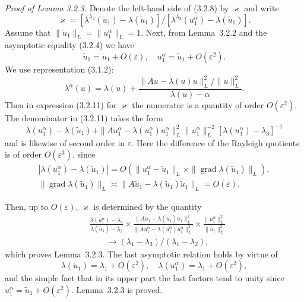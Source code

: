 \documentclass[11pt,oneside]{book}
\begin{document}
\textit{Proof of Lemma 3.2.3.} Denote the left-hand side of (3.2.8) by $\varkappa$ and write
\[
\varkappa = [\lambda^{\lambda_2}(\tilde{u}_1) - \lambda(\tilde{u}_1)] / [\lambda^{\lambda_3}(u_1^\alpha) - \lambda(\tilde{u}_1)].
\tag{3.2.11}
\]
Assume that $\|\tilde{u}_1\|_L = \|u_1^\alpha\|_L = 1$. Next, from Lemma~3.2.2 and %
the asymptotic equality (3.2.4) we have
\[
\tilde{u}_1 = u_1 + O(\varepsilon), \quad u_1^\alpha = \tilde{u}_1 + O(\varepsilon^2).
\]
We use representation (3.1.2):
\[
\lambda^\alpha(u) = \lambda(u) + \frac{\|Au - \lambda(u)u\|_L^2 / \|u\|_L^2}{\lambda(u) - \alpha}.
\]
Then in expression (3.2.11) for $\varkappa$ the numerator is a quantity of order $O(\varepsilon^2)$. The denominator in (3.2.11) takes the form
\[
\lambda(u_1^\alpha) - \lambda(\tilde{u}_1) + \|Au_1^\alpha - \lambda(u_1^\alpha)u_1^\alpha\|_L^2 \|u_1^\alpha\|_L^{-2} [\lambda(u_1^\alpha) - \lambda_3]^{-1}
\]
and is likewise of second order in $\varepsilon$. Here the difference of the Rayleigh quotients is of order $O(\varepsilon^3)$, since
\begin{gather*}
|\lambda(u_1^\alpha) - \lambda(\tilde{u}_1)| = O(\|u_1^\alpha - \tilde{u}_1\|_L \times \|\operatorname{grad} \lambda(\tilde{u}_1)\|_L), \\
\|\operatorname{grad} \lambda(\tilde{u}_1)\|_L \asymp \|A\tilde{u}_1 - \lambda(\tilde{u}_1)\tilde{u}_1\|_L = O(\varepsilon).
\end{gather*}

Then, up to $O(\varepsilon)$, $\varkappa$ is determined by the quantity
\[
\begin{aligned}
&\frac{\lambda(u_1^\alpha) - \lambda_3}{\lambda(\tilde{u}_1) - \lambda_2} \times \frac{\|A\tilde{u}_1 - \lambda(\tilde{u}_1)\tilde{u}_1\|_L^2}{\|Au_1^\alpha - \lambda(u_1^\alpha)u_1^\alpha\|_L^2} \times \frac{\|u_1^\alpha\|_L^2}{\|\tilde{u}_1\|_L^2} \\
&\qquad \to (\lambda_1 - \lambda_3) / (\lambda_1 - \lambda_2),
\end{aligned}
\]
which proves Lemma~3.2.3. The last asymptotic relation holds by virtue of
\[
\lambda(\tilde{u}_1) = \lambda_1 + O(\varepsilon^2), \quad \lambda(u_1^\alpha) = \lambda_1 + O(\varepsilon^2),
\]
and the simple fact that in its upper part the last factors tend to unity since $u_1^\alpha = \tilde{u}_1 + O(\varepsilon^2)$. Lemma~3.2.3 is proved.
\end{document}
